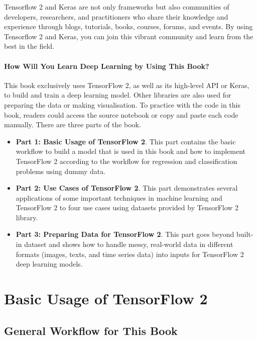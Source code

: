 \documentclass[
  letterpaper,
  DIV=11,
  numbers=noendperiod]{scrreprt}
\providecommand{\tightlist}{%
  \setlength{\itemsep}{0pt}\setlength{\parskip}{0pt}}\usepackage{longtable,booktabs,array}
\begin{document}
Tensorflow 2 and Keras are not only frameworks but also communities of
developers, researchers, and practitioners who share their knowledge and
experience through blogs, tutorials, books, courses, forums, and events.
By using Tensorflow 2 and Keras, you can join this vibrant community and
learn from the best in the field.

\hypertarget{how-will-you-learn-deep-learning-by-using-this-book}{%
\subsection*{How Will You Learn Deep Learning by Using This
Book?}\label{how-will-you-learn-deep-learning-by-using-this-book}}

This book exclusively uses TensorFlow 2, as well as its high-level API
or Keras, to build and train a deep learning model. Other libraries are
also used for preparing the data or making visualisation. To practice
with the code in this book, readers could access the source notebook or
copy and paste each code manually. There are three parts of the book.

\begin{itemize}
\tightlist
\item
  \textbf{Part 1: Basic Usage of TensorFlow 2}. This part contains the
  basic workflow to build a model that is used in this book and how to
  implement TensorFlow 2 according to the workflow for regression and
  classification problems using dummy data.
\item
  \textbf{Part 2: Use Cases of TensorFlow 2}. This part demonstrates
  several applications of some important techniques in machine learning
  and TensorFlow 2 to four use cases using datasets provided by
  TensorFlow 2 library.
\item
  \textbf{Part 3: Preparing Data for TensorFlow 2}. This part goes
  beyond built-in dataset and shows how to handle messy, real-world data
  in different formats (images, texts, and time series data) into inputs
  for TensorFlow 2 deep learning models.
\end{itemize}

\part{{Basic Usage of TensorFlow 2}}

\hypertarget{general-workflow-for-this-book}{%
\chapter{General Workflow for This
Book}\label{general-workflow-for-this-book}}
\end{document}
